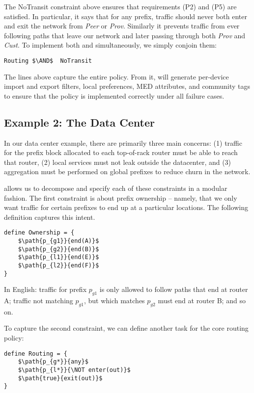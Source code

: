The \textsf{NoTransit} constraint above ensures that requirements (P2) and (P5) are satisfied. In particular, it says that for any prefix, traffic should never both enter and exit the network from \textit{Peer} or \textit{Prov}. Similarly it prevents traffic from ever following paths that leave our network and later passing through both \textit{Prov} and \textit{Cust}.  To implement both 
and  simultaneously, we simply conjoin them:

\begin{lstlisting}[mathescape=true]
Routing $\AND$  NoTransit
\end{lstlisting}

The lines above capture the entire policy. From it, \sysname will generate per-device import and export filters, local preferences,
MED attributes, and community tags to ensure that the policy is
implemented correctly under all failure cases.

\subsection{Example 2: The Data Center}

In our data center example,
there are primarily three main concerns:
(1) traffic for the prefix block allocated to each top-of-rack router must be able to reach that router,
(2) local services must not leak outside the datacenter, and
(3) aggregation must be performed on global prefixes to reduce churn
in the network.

\sysname allows us to decompose and specify each of these constraints in a modular fashion. The first constraint is about prefix ownership -- namely, that we only want traffic for certain prefixes to end up at a particular locations. The following definition captures this intent.

\begin{lstlisting}[mathescape=true]
define Ownership = {
    $\path{p_{g1}}{end(A)}$
    $\path{p_{g2}}{end(B)}$
    $\path{p_{l1}}{end(E)}$
    $\path{p_{l2}}{end(F)}$
}
\end{lstlisting}

In English: traffic for prefix $p_{g1}$ is only allowed to follow paths that
end at router A; traffic not matching $p_{g1}$, but which matches $p_{g2}$ must
end at router B; and so on.

To capture the second constraint, we can define another task for the core
routing policy:

\begin{lstlisting}[mathescape=true]
define Routing = {
    $\path{p_{g*}}{any}$
    $\path{p_{l*}}{\NOT enter(out)}$
    $\path{true}{exit(out)}$
}
\end{lstlisting}

